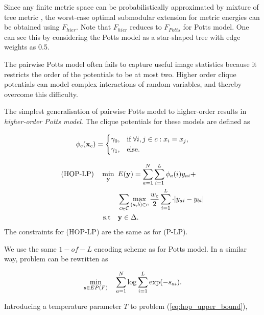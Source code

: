 Since any finite metric space can be probabilistically approximated by mixture
of tree metric \citep{bartal1996probabilistic}, the worst-case optimal
submodular extension for metric energies can be obtained using $F_{hier}$. Note
that $F_{hier}$ reduces to $F_{Potts}$ for Potts model. One can see this by
considering the Potts model as a star-shaped tree with edge weights as 0.5.

 The pairwise Potts model often fails
to capture useful image statistics because it restricts the order of the
potentials to be at most two. Higher order clique potentials can model complex
interactions of random variables, and thereby overcome this difficulty.

The simplest generalisation of pairwise Potts model to higher-order results in
\textit{higher-order Potts model}. The clique potentials for these models are
defined as

\begin{equation}
  \phi_c({\bf x}_c) = 
  \begin{cases}
    \gamma_0, &{\text{if}} \; \forall i, j \in c: x_i = x_j, \\
    \gamma_1, &{\text{else}}. 
  \end{cases} 
\end{equation}

\begin{align}
    \text{(HOP-LP)} \quad \min_{\bf y} \enskip & E({\bf y}) =  \sum_{a = 1}^N
    \sum_{i = 1}^L \phi_a(i)y_{ai} + \nonumber\\
    &\sum_{c \in {\mathcal C}} \max_{(a, b) \in c} \frac{w_c}{2} \sum_{i = 1}^L \cdot |y_{ai} - y_{bi}| \nonumber\\
    \text{s.t} \quad &{\bf y} \in \Delta.
\label{eq:hop-lp}
\end{align}
The constraints for (HOP-LP) are the same as for (P-LP).

 We use the same $1-of-L$ encoding
scheme as for Potts model. In a similar way, problem can be rewritten as

\begin{equation}
\min_{{\bf s} \in EP(F)} \quad \sum_{a = 1}^{N} \log \sum_{i = 1}^L \exp(-s_{ai}).
\label{eq:hop_upper_bound}
\end{equation}

Introducing a temperature parameter $T$ to problem (\ref{eq:hop_upper_bound}), 

